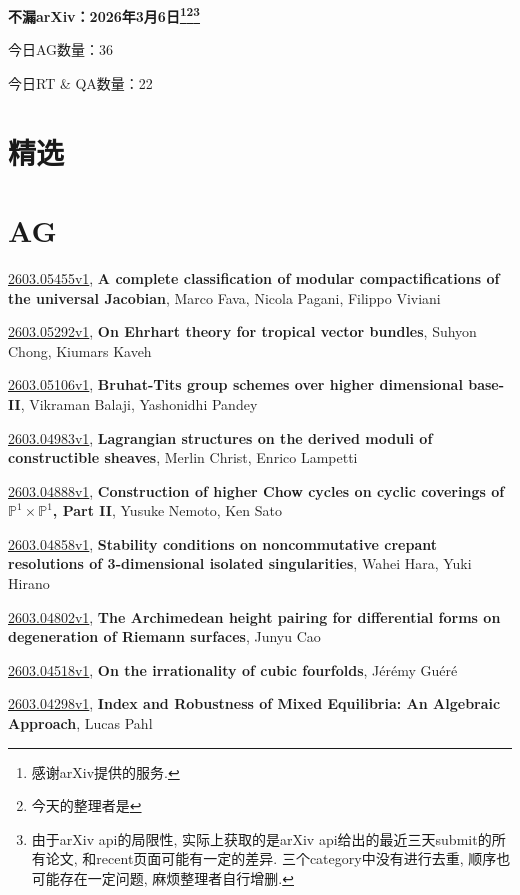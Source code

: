\documentclass[9pt, a4paper]{article}
\theoremstyle{plain}
\theoremstyle{definition}
\theoremstyle{remark}
\newcommand{\arxiv}[3]{\href{https://arxiv.org/abs/#1}{#1}, \textbf{\textcolor{arxivblue}{#2}}, #3}
\newcommand{\AGnumber}{36}
\newcommand{\RTQAnumber}{22}
\newcommand{\NewestDate}{2026年3月6日}
\newcommand{\todayarXiver}{} %
\begin{document}
\begin{center}
    \Huge\textbf{不漏arXiv：\NewestDate\footnote{感谢arXiv提供的服务.}\footnote{今天的整理者是\todayarXiver}\footnote{由于arXiv api的局限性, 实际上获取的是arXiv api给出的最近三天submit的所有论文, 和recent页面可能有一定的差异. 三个category中没有进行去重, 顺序也可能存在一定问题, 麻烦整理者自行增删.}} \\
\end{center}

\setcounter{section}{-1}

\begin{center}
    今日AG数量：\AGnumber
    
    今日RT \& QA数量：\RTQAnumber
    
\end{center}


\section{精选}


\section{AG}
\arxiv{2603.05455v1}{A complete classification of modular compactifications of the universal Jacobian}{Marco Fava, Nicola Pagani, Filippo Viviani}

\arxiv{2603.05292v1}{On Ehrhart theory for tropical vector bundles}{Suhyon Chong, Kiumars Kaveh}

\arxiv{2603.05106v1}{Bruhat-Tits group schemes over higher dimensional base-II}{Vikraman Balaji, Yashonidhi Pandey}

\arxiv{2603.04983v1}{Lagrangian structures on the derived moduli of constructible sheaves}{Merlin Christ, Enrico Lampetti}

\arxiv{2603.04888v1}{Construction of higher Chow cycles on cyclic coverings of $\mathbb{P}^1 \times \mathbb{P}^1$, Part II}{Yusuke Nemoto, Ken Sato}

\arxiv{2603.04858v1}{Stability conditions on noncommutative crepant resolutions of 3-dimensional isolated singularities}{Wahei Hara, Yuki Hirano}

\arxiv{2603.04802v1}{The Archimedean height pairing for differential forms on degeneration of Riemann surfaces}{Junyu Cao}

\arxiv{2603.04518v1}{On the irrationality of cubic fourfolds}{Jérémy Guéré}

\arxiv{2603.04298v1}{Index and Robustness of Mixed Equilibria: An Algebraic Approach}{Lucas Pahl}
\end{document}
